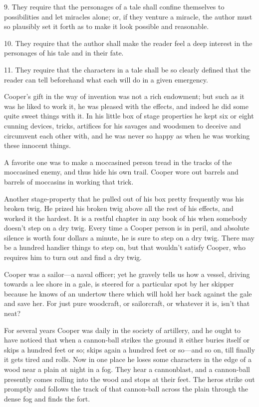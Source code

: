 \documentclass[../interior-demo.tex]{subfiles}
\begin{document}
9. They require that the personages of a tale shall confine themselves
to possibilities and let miracles alone; or, if they venture a miracle,
the author must so plausibly set it forth as to make it look possible
and reasonable.

10. They require that the author shall make the reader feel a deep
interest in the personages of his tale and in their fate.

11. They require that the characters in a tale shall be so clearly
defined that the reader can tell beforehand what each will do in a given
emergency.

Cooper's gift in the way of invention was not a rich endowment; but
such as it was he liked to work it, he was pleased with the effects,
and indeed he did some quite sweet things with it. In his little box of
stage properties he kept six or eight cunning devices, tricks, artifices
for his savages and woodsmen to deceive and circumvent each other with,
and he was never so happy as when he was working these innocent things.

A favorite one was to make a moccasined person tread
in the tracks of the moccasined enemy, and thus hide his own trail.
Cooper wore out barrels and barrels of moccasins in working that trick.

Another stage-property that he pulled out of his box pretty frequently
was his broken twig. He prized his broken twig above all the rest of his
effects, and worked it the hardest. It is a restful chapter in any book
of his when somebody doesn't step on a dry twig. Every time a Cooper person is
in peril, and absolute silence is worth four dollars a minute, he is
sure to step on a dry twig. There may be a hundred handier things to
step on, but that wouldn't satisfy Cooper, who requires him to turn
out and find a dry twig.

Cooper was a sailor---a naval officer; yet he gravely tells us how
a vessel, driving towards a lee shore in a gale, is steered for a
particular spot by her skipper because he knows of an undertow there
which will hold her back against the gale and save her. For just pure
woodcraft, or sailorcraft, or whatever it is, isn't that neat?

For several years Cooper was daily in the society of artillery, and he ought
to have noticed that when a cannon-ball strikes the ground it either
buries itself or skips a hundred feet or so; skips again a hundred feet
or so---and so on, till finally it gets tired and rolls. Now in one place
he loses some characters in the edge of a wood
near a plain at night in a fog. They hear a cannonblast, and a
cannon-ball presently comes rolling into the wood and stops at their
feet. The heros strike out promptly and follows the track of that cannon-ball
across the plain through the dense fog and finds the fort.
\end{document}
